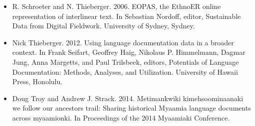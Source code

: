 \documentclass{beamer}
\begin{document}
\begin{frame}
\begin{itemize}
  \item R. Schroeter and N. Thieberger. 2006. EOPAS, the EthnoER online representation of interlinear text. In Sebastian Nordoff, editor, Sustainable Data from Digital Fieldwork. University of Sydney, Sydney.
  \item Nick Thieberger. 2012. Using language documentation data in a broader context. In Frank Seifart, Geoffrey Haig, Nikolaus P. Himmelmann, Dagmar Jung, Anna Margetts, and Paul Trilsbeek, editors, Potentials of Language Documentation: Methods, Analyses, and Utilization. University of Hawaii Press, Honolulu.
  \item Doug Troy and Andrew J. Strack. 2014. Metimankwiki kimehsoominaanaki we follow our ancestors trail: Sharing historical Myaamia language documents across myaamionki. In Proceedings of the 2014 Myaamiaki Conference.
\end{itemize}

\end{frame}
\end{document}
